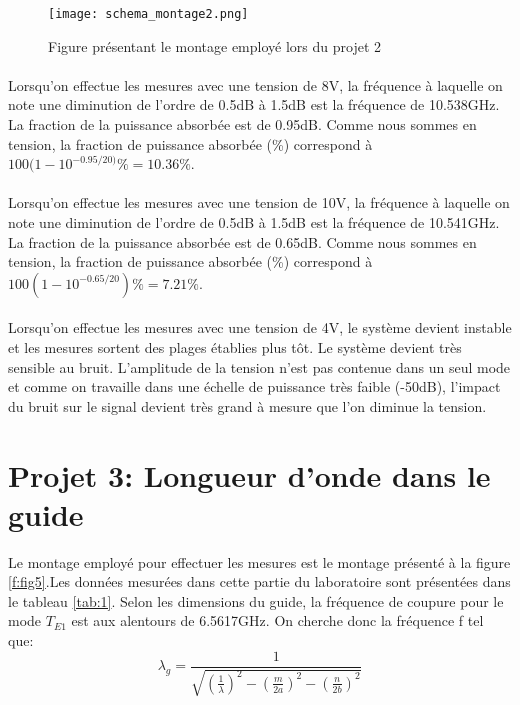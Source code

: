 \begin{figure}
\centering
\texttt{[image: schema\_montage2.png]}
\caption{Figure présentant le montage employé lors du projet 2}
\label{f:fig4}
\end{figure}

\paragraph{}Lorsqu'on effectue les mesures avec une tension de 8V, la fréquence à laquelle on note une diminution de l'ordre de 0.5dB à 1.5dB est la fréquence de 10.538GHz. La fraction de la puissance absorbée est de 0.95dB. Comme nous sommes en tension, la fraction de puissance absorbée (\%) correspond à  $100(1- 10^{-0.95/20)}\% = 10.36\%$.

\paragraph{}Lorsqu'on effectue les mesures avec une tension de 10V, la fréquence à laquelle on note une diminution de l'ordre de 0.5dB à 1.5dB est la fréquence de 10.541GHz. La fraction de la puissance absorbée est de 0.65dB. Comme nous sommes en tension, la fraction de puissance absorbée (\%) correspond à  $100(1- 10^{-0.65/20})\% = 7.21\%$.

\paragraph{}Lorsqu'on effectue les mesures avec une tension de 4V, le système devient instable et les mesures sortent des plages établies plus tôt. Le système devient très sensible au bruit. L'amplitude de la tension n'est pas contenue dans un seul mode et comme on travaille dans une échelle de puissance très faible (-50dB), l'impact du bruit sur le signal devient très grand à mesure que l'on diminue la tension.

\section{Projet 3: Longueur d'onde dans le guide}
Le montage employé pour effectuer les mesures est le montage présenté à la figure \ref{f:fig5}.Les données mesurées dans cette partie du laboratoire sont présentées dans le tableau \ref{tab:1}. Selon les dimensions du guide, la fréquence de coupure pour le mode $T_{E1}$ est aux alentours de 6.5617GHz. On cherche donc la fréquence f tel que:
\begin{equation}
\lambda_g = \frac{1}{\sqrt{\left(\frac{1}{\lambda}\right)^2 - \left( \frac{m}{2a}\right)^2  - \left( \frac{n}{2b}\right)^2}}
\end{equation}

